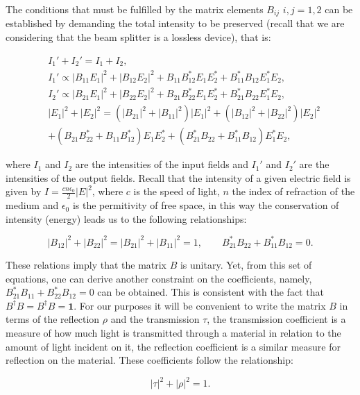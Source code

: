 \documentclass[12pt]{book}
\begin{document}
The conditions  that must be fulfilled by the matrix elements $B_{ij}$  $i,j=1,2$  can be established by demanding the total intensity to be preserved (recall that we are considering that the beam splitter is a lossless device), that is:

\begin{align}
&I_{1}'+I_{2}'=I_{1}+I_{2}, \\
&I_{1}'\propto|B_{11} E_{1}|^{2}+|B_{12} E_{2}|^{2}+B_{11} B_{12}^{*} E_{1} E_{2}^{*}+B_{11}^{*} B_{12} E_{1}^{*} E_{2}, \\
&I_{2}'\propto|B_{21} E_{1}|^{2}+|B_{22} E_{2}|^{2}+B_{21} B_{22}^{*} E_{1} E_{2}^{*}+B_{21}^{*} B_{22} E_{1}^{*} E_{2},\\
&|E_{1}|^{2}+|E_{2}|^{2}=(|B_{21}|^{2}+|B_{11}|^{2})|E_{1}|^{2}+(|B_{12}|^{2}+|B_{22}|^{2})|E_{2}|^{2}\\
&+(B_{21} B_{22}^{*}+B_{11} B_{12}^{*})E_{1} E_{2}^{*}+(B_{21}^{*} B_{22}+B_{11}^{*} B_{12})E_{1}^{*} E_{2},
\end{align}

where $I_{1}$ and $I_{2}$ are the intensities of the input fields and $I_{1}'$ and $I_{2}'$ are the intensities of the output fields. Recall that the intensity of a given electric field is given by $I=\frac{c n \epsilon_{0}}{2} |E|^{2}$, where $c$ is the speed of light, $n$ the index of refraction of the medium and $\epsilon_{0}$ is the permitivity of free space, in this way the conservation of intensity (energy) leads us to the following relationships:

\begin{equation}
|B_{12}|^{2}+|B_{22}|^{2}=|B_{21}|^{2}+|B_{11}|^{2}=1,\qquad B_{21}^{*} B_{22}+B_{11}^{*} B_{12}=0.
\end{equation}

These relations imply that the matrix $B$ is unitary. Yet, from this set of equations, one can derive another constraint on the coefficients, namely, $B_{21}^{*} B_{11}+B_{22}^{*} B_{12}=0$ can be obtained. This is consistent with the fact that $B^{\dagger}B=B^{\dagger}B= \mathbf{1}$. For our purposes it will be convenient to write the matrix $B$ in terms of the reflection $\rho$ and the transmission $\tau$, the transmission coefficient is a measure of how much light is transmitted through a material in relation to the amount of light incident on it, the reflection coefficient is a similar measure for reflection on the material. These coefficients follow the relationship:

\begin{equation}
|\tau|^{2}+|\rho|^{2}=1.
\end{equation}
 
\end{document}
